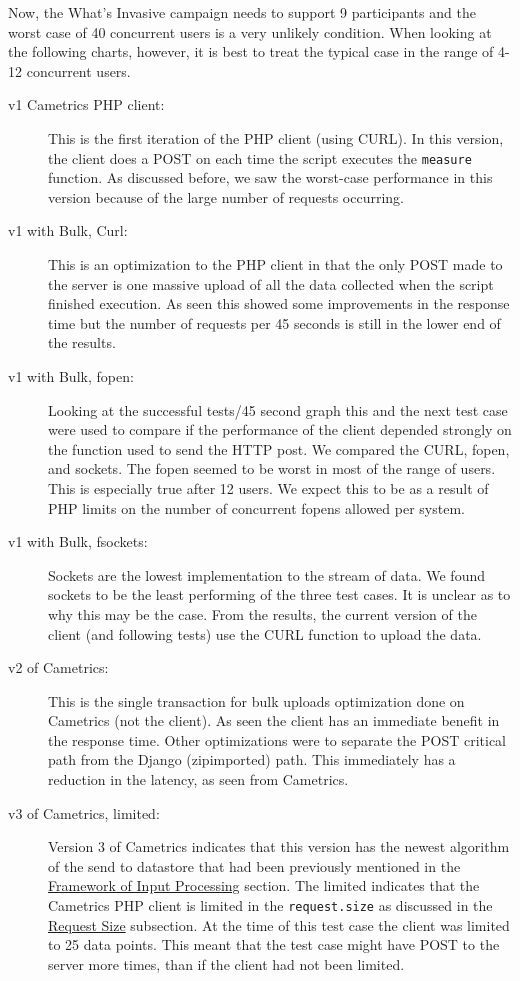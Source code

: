 \documentclass[10pt,a4paper,english]{article}
\begin{document}
Now, the What's Invasive campaign needs to support 9 participants and the worst case of 40 concurrent users is a very unlikely condition. When looking at the following charts, however, it is best to treat the typical case in the range of 4-12 concurrent users.
\begin{description}
\item[{v1 Cametrics PHP client:}] \leavevmode 
This is the first iteration of the PHP client (using CURL). In this version, the client does a POST on each time the script executes the \texttt{measure} function. As discussed before, we saw the worst-case performance in this version because of the large number of requests occurring.

\item[{v1 with Bulk, Curl:}] \leavevmode 
This is an optimization to the PHP client in that the only POST made to the server is one massive upload of all the data collected when the script finished execution. As seen this showed some improvements in the response time but the number of requests per 45 seconds is still in the lower end of the results.

\item[{v1 with Bulk, fopen:}] \leavevmode 
Looking at the successful tests/45 second graph this and the next test case were used to compare if the performance of the client depended strongly on the function used to send the HTTP post. We compared the CURL, fopen, and sockets. The fopen seemed to be worst in most of the range of users. This is especially true after 12 users. We expect this to be as a result of PHP limits on the number of concurrent fopens allowed per system.

\item[{v1 with Bulk, fsockets:}] \leavevmode 
Sockets are the lowest implementation to the stream of data. We found sockets to be the least performing of the three test cases. It is unclear as to why this may be the case. From the results, the current version of the client (and following tests) use the CURL function to upload the data.

\item[{v2 of Cametrics:}] \leavevmode 
This is the single transaction for bulk uploads optimization done on Cametrics (not the client). As seen the client has an immediate benefit in the response time. Other optimizations were to separate the POST critical path from the Django (zipimported) path. This immediately has a reduction in the latency, as seen from Cametrics.

\item[{v3 of Cametrics, limited:}] \leavevmode 
Version 3 of Cametrics indicates that this version has the newest algorithm of the send to datastore that had been previously mentioned in the \href{\#framework-of-input-processing}{Framework of Input Processing} section. The limited indicates that the Cametrics PHP client is limited in the \texttt{request.size} as discussed in the \href{\#request-size}{Request Size} subsection. At the time of this test case the client was limited to 25 data points. This meant that the test case might have POST to the server more times, than if the client had not been limited.


\end{description}
\end{document}
